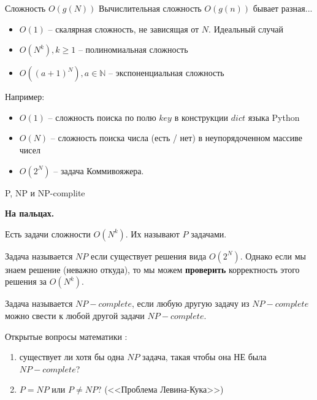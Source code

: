 \begin{frame}{Сложность $O(g(N))$}
	Вычислительная сложность $O(g(n))$ бывает разная...
	
	\begin{itemize}
		\item $O(1)$ -- скалярная сложность, не зависящая от $N$. Идеальный случай
		\item $O(N^k), k \geqslant 1 $ -- полиномиальная сложность
		\item $O((a+1)^N), a \in \mathbb{N}$ -- экспоненциальная сложность
	\end{itemize}
	
	Например:
	\begin{itemize}
		\item $O(1)$ -- сложность поиска по полю $key$ в конструкции $dict$ языка Python
		\item $O(N)$ -- сложность поиска числа (есть / нет) в неупорядоченном массиве чисел
		\item $O(2^N)$ -- задача Коммивояжера.
	\end{itemize}
\end{frame}


\begin{frame}{P, NP и NP-complite}
	\footnotesize
	
	\textbf{На пальцах.}
	
	Есть задачи сложности $O(N^k)$. Их называют $P$ задачами.
	
	Задача называется $NP$ если существует решения вида $O(2^N)$. 
	Однако если мы знаем решение (неважно откуда), то мы можем
	\textbf{проверить} корректность этого решения за $O(N^k)$.
	
	Задача называется $NP-complete$, если любую другую задачу из $NP-complete$
	можно свести к любой другой задачи $NP-complete$.
	
	Открытые вопросы математики :
	\begin{enumerate}
		\item существует ли хотя бы одна $NP$ задача, такая чтобы она НЕ была $NP-complete$?
		\item $P = NP$ или $P \neq NP$? (<<Проблема Левина-Кука>>)
	\end{enumerate}
	
	
	
	
\end{frame}

